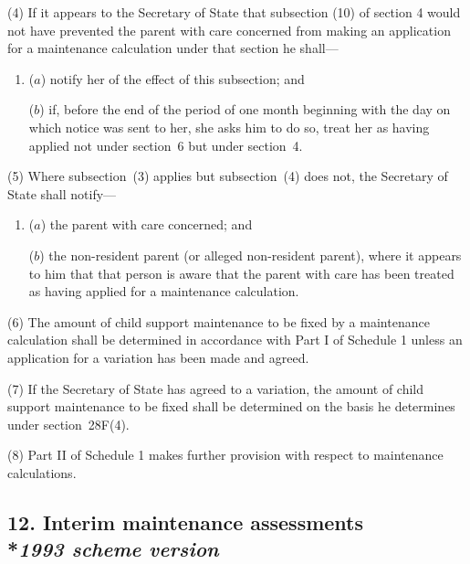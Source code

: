 \documentclass[12pt,a4paper]{article}
\begin{document}
(4) If it appears to the Secretary of State that subsection (10)  of section 4 would not have prevented the parent with care concerned from making an application for a maintenance calculation under that section he shall—
\begin{enumerate}\item[]
($a$) notify her of the effect of this subsection; and

($b$) if, before the end of the period of one month beginning with the day on which notice was sent to her, she asks him to do so, treat her as having applied not under section~6 but under section~4. 
\end{enumerate}

(5) Where subsection~(3)  applies but subsection~(4)  does not, the Secretary of State shall notify—
\begin{enumerate}\item[]
($a$) the parent with care concerned; and

($b$) the non-resident parent (or alleged non-resident parent), where it appears to him that that person is aware that the parent with care has been treated as having applied for a maintenance calculation.
\end{enumerate}

(6) The amount of child support maintenance to be fixed by a maintenance calculation shall be determined in accordance with Part I of Schedule 1 unless an application for a variation has been made and agreed.

(7) If the Secretary of State has agreed to a variation, the amount of child support maintenance to be fixed shall be determined on the basis he determines under section~28F(4).

(8) Part II of Schedule 1 makes further provision with respect to maintenance calculations.


\subsection[12. Interim maintenance assessments --- \emph{1993 scheme version}]{12. Interim maintenance assessments\\*\emph{1993 scheme version}}

\end{document}

